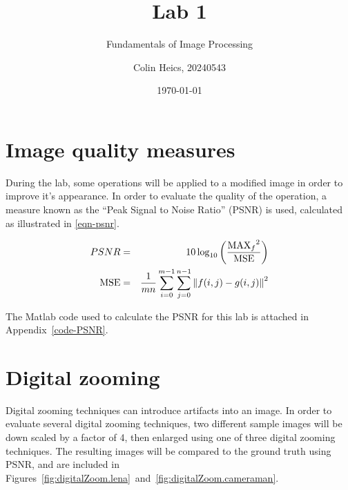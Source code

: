 \documentclass[article, 1.5space, letterpaper, 12pt, oneside, header, footer]{SydeClass}
\title{Lab 1}
\subtitle{Fundamentals of Image Processing}
\author{Colin Heics, 20240543}
\date{\today}
\begin{document}



\section{Image quality measures}

During the lab, some operations will be applied to a modified image in order to improve it's appearance. In order to evaluate the quality of the operation, a measure known as the ``Peak Signal to Noise Ratio'' (PSNR) is used, calculated as illustrated in \eqref{eqn-psnr}.

\begin{eqnarray}
\label{eqn-psnr}
PSNR & = & 10 \log_{10}\left ( \frac{{\textup{MAX}_f}^{2}}{\textup{MSE}} \right ) \\
\textup{MSE} & = &\frac{1}{mn} \sum_{i=0}^{m-1}\sum_{j=0}^{n-1} \left \| f(i,j) - g(i,j) \right \|^2
\end{eqnarray}

The Matlab code used to calculate the PSNR for this lab is attached in Appendix~\ref{code-PSNR}.


\section{Digital zooming}

Digital zooming techniques can introduce artifacts into an image. In order to evaluate several digital zooming techniques, two different sample images will be down scaled by a factor of 4, then enlarged using one of three digital zooming techniques. The resulting images will be compared to the ground truth using PSNR, and are included in Figures~\ref{fig:digitalZoom.lena}~and~\ref{fig:digitalZoom.cameraman}.
\end{document}
